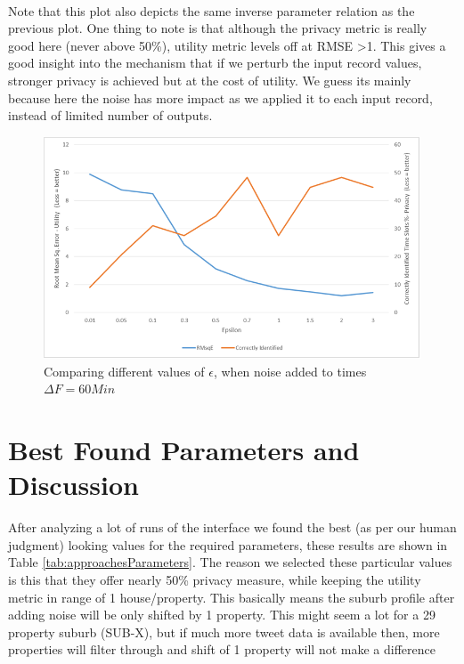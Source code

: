 \documentclass[12pt]{report}
\theoremstyle{named}
\begin{document}
\paragraph{}
Note that this plot also depicts the same inverse parameter relation as the previous plot. One thing to note is that although the privacy metric is really good here (never above 50\%), utility metric levels off at RMSE \textgreater 1. This gives a good insight into the mechanism that if we perturb the input record values, stronger privacy is achieved but at the cost of utility. We guess its mainly because here the noise has more impact as we applied it to each input record, instead of limited number of outputs.  
\begin{figure}[ht]
\centering
        \includegraphics[width=150mm,scale=1]{Images/RunWithTimes.png}
    \caption{Comparing different values of $\epsilon$, when noise added to times $\Delta F = 60 Min$}
    \label{fig:RunWithTimes}
\end{figure}



\section{Best Found Parameters and Discussion}
After analyzing a lot of runs of the interface we found the best (as per our human judgment) looking values for the required parameters, these results are shown in Table \ref{tab:approachesParameters}. The reason we selected these particular values is this that they offer nearly 50\% privacy measure, while keeping the utility metric in range of 1 house/property. This basically means the suburb profile after adding noise will be only shifted by 1 property. This might seem a lot for a 29 property suburb (SUB-X), but if much more tweet data is available then, more properties will filter through and shift of 1 property will not make a difference
\end{document}
